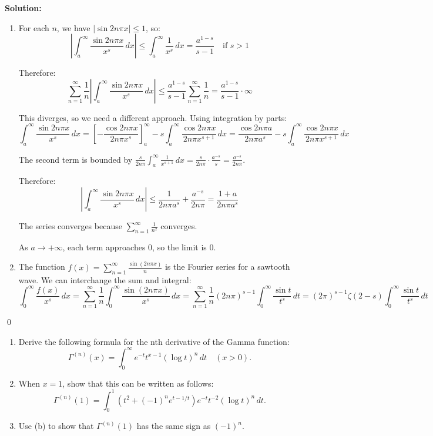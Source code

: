 \noindent\textbf{Solution:}
\begin{enumerate}[label=(\alph*)]
    \item For each $n$, we have $|\sin 2n\pi x| \leq 1$, so:
    \[\left|\int_{a}^{\infty} \frac{\sin 2n\pi x}{x^{s}} \, dx\right| \leq \int_{a}^{\infty} \frac{1}{x^{s}} \, dx = \frac{a^{1-s}}{s-1} \quad \text{if } s > 1\]
    
    Therefore:
    \[\sum_{n=1}^{\infty} \frac{1}{n} \left|\int_{a}^{\infty} \frac{\sin 2n\pi x}{x^{s}} \, dx\right| \leq \frac{a^{1-s}}{s-1} \sum_{n=1}^{\infty} \frac{1}{n} = \frac{a^{1-s}}{s-1} \cdot \infty\]
    
    This diverges, so we need a different approach. Using integration by parts:
    \[\int_{a}^{\infty} \frac{\sin 2n\pi x}{x^{s}} \, dx = \left[-\frac{\cos 2n\pi x}{2n\pi x^{s}}\right]_{a}^{\infty} - s \int_{a}^{\infty} \frac{\cos 2n\pi x}{2n\pi x^{s+1}} \, dx = \frac{\cos 2n\pi a}{2n\pi a^{s}} - s \int_{a}^{\infty} \frac{\cos 2n\pi x}{2n\pi x^{s+1}} \, dx\]
    
    The second term is bounded by $\frac{s}{2n\pi} \int_{a}^{\infty} \frac{1}{x^{s+1}} \, dx = \frac{s}{2n\pi} \cdot \frac{a^{-s}}{s} = \frac{a^{-s}}{2n\pi}$.
    
    Therefore:
    \[\left|\int_{a}^{\infty} \frac{\sin 2n\pi x}{x^{s}} \, dx\right| \leq \frac{1}{2n\pi a^{s}} + \frac{a^{-s}}{2n\pi} = \frac{1 + a}{2n\pi a^{s}}\]
    
    The series converges because $\sum_{n=1}^{\infty} \frac{1}{n^2}$ converges.
    
    As $a \to +\infty$, each term approaches 0, so the limit is 0.
    
    \item The function $f(x) = \sum_{n=1}^{\infty} \frac{\sin(2n\pi x)}{n}$ is the Fourier series for a sawtooth wave. We can interchange the sum and integral:
    \[\int_{0}^{\infty} \frac{f(x)}{x^{s}} \, dx = \sum_{n=1}^{\infty} \frac{1}{n} \int_{0}^{\infty} \frac{\sin(2n\pi x)}{x^{s}} \, dx = \sum_{n=1}^{\infty} \frac{1}{n} (2n\pi)^{s-1} \int_{0}^{\infty} \frac{\sin t}{t^{s}} \, dt = (2\pi)^{s-1} \zeta(2-s) \int_{0}^{\infty} \frac{\sin t}{t^{s}} \, dt\]
\end{enumerate}\qed


\begin{problembox}
\begin{enumerate}[label=(\alph*)]
    \item Derive the following formula for the nth derivative of the Gamma function:
    \[\Gamma^{(n)}(x) = \int_{0}^{\infty} e^{-t} t^{x-1} (\log t)^{n} \, dt \quad (x > 0).\]
    \item When $x = 1$, show that this can be written as follows:
    \[\Gamma^{(n)}(1) = \int_{0}^{1} (t^{2} + (-1)^{n} e^{t-1/t}) e^{-t} t^{-2} (\log t)^{n} \, dt.\]
    \item Use (b) to show that $\Gamma^{(n)}(1)$ has the same sign as $(-1)^{n}$.
\end{enumerate}
\end{problembox}

